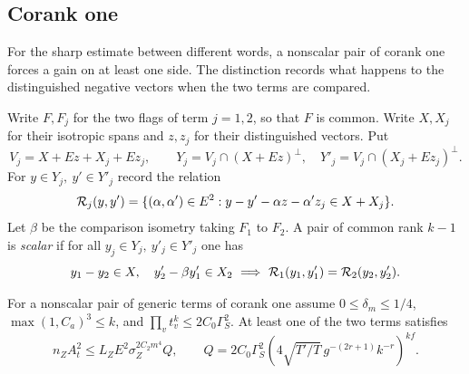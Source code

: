 \subsection{Corank one}

For the sharp estimate between different words, a nonscalar pair
of corank one forces a gain on at least one side. The distinction
records what happens to the distinguished negative vectors when the
two terms are compared.

\begin{definition}\label{def:corank-one-scalar}
Write \(F,F_j\) for the two flags of term \(j=1,2\), so that \(F\)
is common. Write \(X,X_j\) for their isotropic spans and \(z,z_j\)
for their distinguished vectors. Put
\[
 V_j=X+Ez+X_j+Ez_j,\qquad
 Y_j=V_j\cap(X+Ez)^\perp,\quad Y'_j=V_j\cap(X_j+Ez_j)^\perp .
\]
For \(y\in Y_j,\ y'\in Y'_j\) record the relation
\[
 {\cal R}_j(y,y')=
 \{(\alpha,\alpha')\in E^2:
 y-y'-\alpha z-\alpha'z_j\in X+X_j\}.
\]
Let \(\beta\) be the comparison isometry taking \(F_1\) to \(F_2\).
A pair of common rank \(k-1\) is \emph{scalar} if for all
\(y_j\in Y_j,\ y'_j\in Y'_j\) one has
\[
 y_1-y_2\in X,\quad y'_2-\beta y'_1\in X_2
       \ \Longrightarrow\
 {\cal R}_1(y_1,y'_1)={\cal R}_2(y_2,y'_2).
\]
\end{definition}

\begin{lemma}\label{lem:row-corank-one-gain}
For a nonscalar pair of generic terms of corank one assume
\(0\le\delta_m\le1/4\), \(\max(1,C_a)^3\le k\), and
\(\prod_v t_v^k\le2C_0\Gamma_S^2\). At least one of the two terms
satisfies
\[
 n_Z A_t^2\le L_Z E^2\sigma_Z^{2C_2m^4}Q,\qquad
 Q=2C_0\Gamma_S^2
       (4\sqrt{T'/T}\,g^{-(2r+1)}k^{-r})^{kf}.
\]
\end{lemma}

